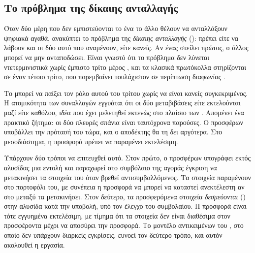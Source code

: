 \subsection{Το πρόβλημα της δίκαιης ανταλλαγής}
\label{sec:fair-exchange}

Όταν δύο μέρη που δεν εμπιστεύονται το ένα το άλλο θέλουν να ανταλλάξουν ψηφιακά αγαθά,
ανακύπτει το πρόβλημα της \emph{δίκαιης ανταλλαγής} (): πρέπει είτε να
λάβουν και οι δύο αυτό που αναμένουν, είτε κανείς. Αν ένας στείλει πρώτος, ο άλλος μπορεί
να μην ανταποδώσει. Είναι γνωστό ότι το πρόβλημα δεν λύνεται ντετερμινιστικά χωρίς έμπιστο
τρίτο μέρος \cite{pagnia1999}, και τα κλασικά πρωτόκολλα στηρίζονται σε έναν τέτοιο τρίτο,
που παρεμβαίνει τουλάχιστον σε περίπτωση διαφωνίας \cite{asokan1997}.

Το  μπορεί να παίξει τον ρόλο αυτού του τρίτου χωρίς να είναι κανείς
συγκεκριμένος. Η ατομικότητα των συναλλαγών εγγυάται ότι οι δύο μεταβιβάσεις είτε
εκτελούνται μαζί είτε καθόλου, ιδέα που έχει μελετηθεί εκτενώς στο πλαίσιο των
 \cite{herlihy2018}. Απομένει ένα πρακτικό ζήτημα: οι δύο πλευρές σπάνια
είναι ταυτόχρονα παρούσες. Ο προσφέρων υποβάλλει την πρότασή του τώρα, και ο αποδέκτης θα
τη δει αργότερα. Στο μεσοδιάστημα, η προσφορά πρέπει να παραμένει εκτελέσιμη.

Υπάρχουν δύο τρόποι να επιτευχθεί αυτό. Στον πρώτο, ο προσφέρων υπογράφει εκτός αλυσίδας
μια εντολή και παραχωρεί στο συμβόλαιο της αγοράς έγκριση να μετακινήσει τα στοιχεία του
όταν βρεθεί αντισυμβαλλόμενος. Τα στοιχεία παραμένουν στο πορτοφόλι του, με συνέπεια η
προσφορά να μπορεί να καταστεί ανεκτέλεστη αν στο μεταξύ τα μετακινήσει. Στον δεύτερο, τα
προσφερόμενα στοιχεία \emph{δεσμεύονται} () στην αλυσίδα κατά την υποβολή, υπό
τον έλεγχο του συμβολαίου. Η προσφορά είναι τότε εγγυημένα εκτελέσιμη, με τίμημα ότι τα
στοιχεία δεν είναι διαθέσιμα στον προσφέροντα μέχρι να αποσύρει την προσφορά. Το μοντέλο
αντικειμένων του , στο οποίο δεν υπάρχουν διαρκείς εγκρίσεις, ευνοεί τον δεύτερο
τρόπο, και αυτόν ακολουθεί η εργασία.
